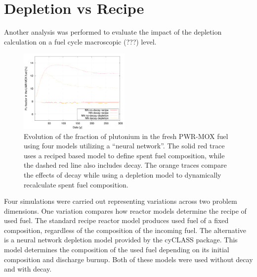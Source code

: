 \documentclass{anstrans}
\begin{document}
\section{Depletion vs Recipe}

Another analysis was performed to evaluate the impact of the depletion
calculation on a fuel cycle macroscopic (???) level.

\begin{figure}[ht] %
  \centering
  \includegraphics[width=0.48\textwidth]{irradiation_pu_contribution.png}
  \caption{Evolution of the fraction of plutonium in the fresh PWR-MOX fuel
    using four models utilizing a ``neural network''.  The solid red trace
    uses a reciped based model to define spent fuel composition, while the
    dashed red line also includes decay.  The orange traces compare the effects
    of decay while using a depletion model to dynamically recalculate spent
    fuel composition.}
  \label{fig:depletion}
\end{figure}



Four simulations were carried out representing variations across two problem
dimensions.  One variation compares how reactor models determine the recipe of
used fuel.  The standard recipe reactor model produces used fuel of a fixed
composition, regardless of the composition of the incoming fuel.  The
alternative is a neural network depletion model provided by the cyCLASS
package.  This model determines the composition of the used fuel depending on
its initial composition and discharge burnup.  Both of these models were used
without decay and with decay.
\end{document}
